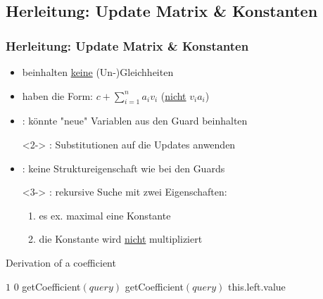 \subsection{Herleitung: Update Matrix \& Konstanten}
\begin{frame}
	\frametitle{Herleitung: Update Matrix \& Konstanten}
	\begin{itemize}
		\item beinhalten \underline{keine} (Un-)Gleichheiten
		\item haben die Form: $c+\sum_{i=1}^{n}a_i v_i$ (\underline{nicht} $v_i a_i$)
		\item {}: k\"onnte "neue" Variablen aus den Guard beinhalten
		\item[]<2-> : Substitutionen auf die Updates anwenden
		\item<2-> : keine Struktureigenschaft wie bei den Guards
		\item[]<3-> : rekursive Suche mit zwei Eigenschaften:
			\begin{enumerate}
				\item es ex. maximal eine Konstante
				\item die Konstante wird \underline{nicht} multipliziert
			\end{enumerate}
	\end{itemize}
\end{frame}

\begin{frame} %
	\begin{algorithm}[H]
		\caption{Derivation of a coefficient}
		\begin{algorithmic}[1]
			\State \Return $1$
			\State \Return $0$
			\EndIf
			\State
			\State \Return getCoefficient$(query)$
			\Else
			\State \Return getCoefficient$(query)$
			\EndIf
			\EndIf
			\State \Return this.left.value
			\EndIf				
			\EndIf
			\EndFunction
		\end{algorithmic}
	\end{algorithm}
\end{frame}


